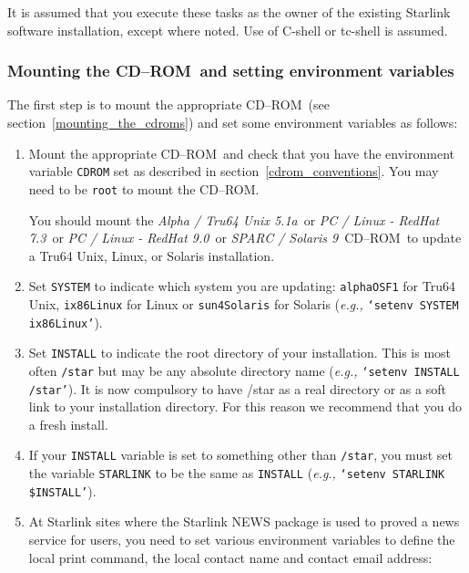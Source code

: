 \documentclass[twoside,11pt]{article}
\newcommand{\htmlref}[2]{#1}
\newcommand{\latex}[1]{#1}
\renewcommand{\_}{\texttt{\symbol{95}}}
\newcommand{\cdrom}{CD--ROM}
\newcommand{\cdrom}{CD-ROM}
\newcommand{\axp}{\textit{Alpha / Tru64 Unix 5.1a}}
\newcommand{\rha}{\textit{PC / Linux - RedHat 7.3}}
\newcommand{\rhb}{\textit{PC / Linux - RedHat 9.0}}
\newcommand{\sol}{\textit{SPARC / Solaris 9}}
\begin{document}
It is assumed that you execute these tasks as the owner of the
existing Starlink software installation, except where noted.
Use of C-shell or tc-shell is assumed.

\subsubsection{Mounting the \cdrom\ and setting environment variables}

The first step is to \htmlref{mount}{mounting_the_cdrom} the appropriate
\cdrom\ \latex{(see section~\ref{mounting_the_cdroms})}
and set some environment variables as follows:

\begin{enumerate}

\item Mount the appropriate \cdrom\ and check that you have the
environment variable \texttt{CDROM} set as described in
section~\ref{cdrom_conventions}.  You may need to be \texttt{root} to
mount the \cdrom.

You should mount the \axp\ or \rha\ or \rhb\ or \sol\ \cdrom\ to update a Tru64
Unix, Linux, or Solaris installation.

\item Set \texttt{SYSTEM} to indicate which system you are updating:
\texttt{alpha\_OSF1} for Tru64 Unix, \texttt{ix86\_Linux} for Linux
or \texttt{sun4\_Solaris} for Solaris (\emph{e.g.,} \texttt{`setenv SYSTEM
ix86\_Linux'}).

\item Set \texttt{INSTALL} to indicate the root directory of your
installation.  This is most often \texttt{/star} but may be any absolute
directory name (\emph{e.g.,} \texttt{`setenv INSTALL /star'}). It
is now compulsory to have /star as a real directory or as a soft
link to your installation directory. For this reason we recommend
that you do a fresh install.

\item If your \texttt{INSTALL} variable is set to something other than
\texttt{/star}, you must set the variable \texttt{STARLINK} to be the
same as \texttt{INSTALL} (\emph{e.g.,} \texttt{`setenv STARLINK \$INSTALL'}).

\item At Starlink sites where the Starlink NEWS package is used to
proved a news service for users, you need to set various environment
variables to define the local print command, the local contact name and
contact email address:


\end{enumerate}
\end{document}
